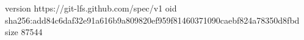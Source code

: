 version https://git-lfs.github.com/spec/v1
oid sha256:add84c6daf32e91a616b9a809820ef959f81460371090caebf824a78350d8fbd
size 87544
